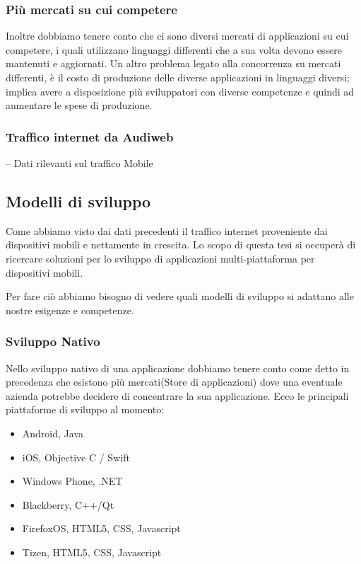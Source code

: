 \subsubsection{Più mercati su cui competere}
Inoltre dobbiamo tenere conto che ci sono diversi mercati di applicazioni su cui competere, i quali utilizzano linguaggi differenti che a sua volta devono essere mantenuti e aggiornati.
Un altro problema legato alla concorrenza su mercati differenti, è il costo di produzione delle diverse applicazioni in linguaggi diversi; implica avere a disposizione più sviluppatori con diverse competenze e quindi ad aumentare le spese di produzione.
\subsubsection{Traffico internet da Audiweb}
-- Dati rilevanti sul traffico Mobile
\subsection{Modelli di sviluppo}
Come abbiamo visto dai dati precedenti il traffico internet proveniente dai dispositivi mobili e nettamente in crescita. Lo scopo di questa tesi si occuperà di ricercare soluzioni per lo sviluppo di applicazioni multi-piattaforma per dispositivi mobili.

Per fare ciò abbiamo bisogno di vedere quali modelli di sviluppo si adattano alle nostre esigenze e competenze.

\subsubsection{Sviluppo Nativo}
Nello sviluppo nativo di una applicazione dobbiamo tenere conto come detto in precedenza che esistono più mercati(Store di applicazioni) dove una eventuale azienda potrebbe decidere di concentrare la sua applicazione. Ecco le principali piattaforme di sviluppo al momento:

\begin{itemize}
\item Android, Java
\item iOS, Objective C / Swift
\item Windows Phone, .NET
\item Blackberry, C++/Qt
\item FirefoxOS, HTML5, CSS, Javascript
\item Tizen, HTML5, CSS, Javascript
\end{itemize}

